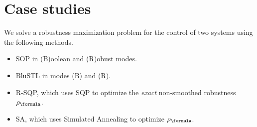 \section{Case studies}
\label{sec:case study}

We solve a robustness maximization problem for the control of two systems using the following methods.

\begin{itemize}
	\vspace{-1pt}
	\item SOP in (B)oolean and (R)obust modes.
	\vspace{-1pt}
	\item BluSTL in modes (B) and (R).
	\item R-SQP, which uses SQP to optimize the \textit{exact} non-smoothed robustness $\robf$.
	\vspace{-1pt}
	\item SA, which uses Simulated Annealing to optimize $\robf$.%
	\vspace{-1pt}
\end{itemize}



